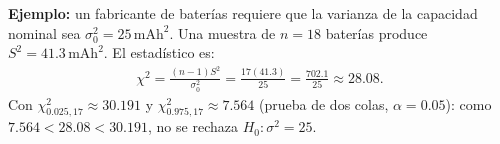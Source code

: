 \begin{solproblema}[prob:a0ad324]
	\textbf{Ejemplo:} un fabricante de baterías requiere que la varianza de la capacidad nominal sea $\sigma_0^2=25\,\text{mAh}^2$. Una muestra de $n=18$ baterías produce $S^2=41.3\,\text{mAh}^2$. El estadístico es:
	\begin{align*}
		\chi^2 = \frac{(n-1)S^2}{\sigma_0^2} = \frac{17(41.3)}{25} = \frac{702.1}{25} \approx28.08.
	\end{align*}
	Con $\chi^2_{0.025,17}\approx30.191$ y $\chi^2_{0.975,17}\approx7.564$ (prueba de dos colas, $\alpha=0.05$): como $7.564<28.08<30.191$, no se rechaza $H_0:\sigma^2=25$.
\end{solproblema}

